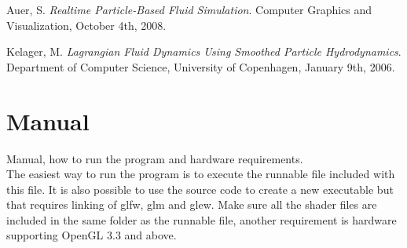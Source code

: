 \documentclass[a4paper,12pt,twoside,final]{report}
\begin{document}

%
%



\begin{thebibliography}{11}

  Auer, S.
  \emph{Realtime Particle-Based Fluid Simulation}.
  Computer Graphics and Visualization,
  October 4th,
  2008.
  
  Kelager, M.
  \emph{Lagrangian Fluid Dynamics Using Smoothed Particle Hydrodynamics}.
  Department of Computer Science, University of Copenhagen,
  January 9th,
  2006.

\end{thebibliography}

\newpage


\appendix
\chapter{Manual}
Manual, how to run the program and hardware requirements. \\
\noindent The easiest way to run the program is to execute the runnable file included with this file. It is also possible to use the source code to create a new executable but that requires linking of glfw, glm and glew. Make sure all the shader files are included in the same folder as the runnable file, another requirement is hardware supporting OpenGL 3.3 and above.
\end{document}
